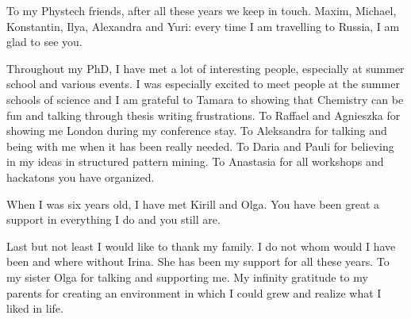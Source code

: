 To my Phystech friends, after all these years we keep in touch. Maxim, Michael, Konstantin, Ilya, Alexandra and Yuri: every time I am travelling to Russia, I am glad to see you.

Throughout my PhD, I have met a lot of interesting people, especially at summer school and various events. I was especially excited to meet people at the summer schools of science and I am grateful to Tamara to showing that Chemistry can be fun and talking through thesis writing frustrations. To Raffael and Agnieszka for showing me London during my conference stay. To Aleksandra for talking and being with me when it has been really needed. To Daria and Pauli for believing in my ideas in structured pattern mining. To Anastasia for all workshops and hackatons you have organized.

When I was six years old, I have met Kirill and Olga. You have been great a support in everything I do and you still are.

Last but not least I would like to thank my family. I do not whom would I have been and where without Irina. She has been my support for all these years. To my sister Olga for talking and supporting me. My infinity gratitude to my parents for creating an environment in which I could grew and realize what I liked in life.

